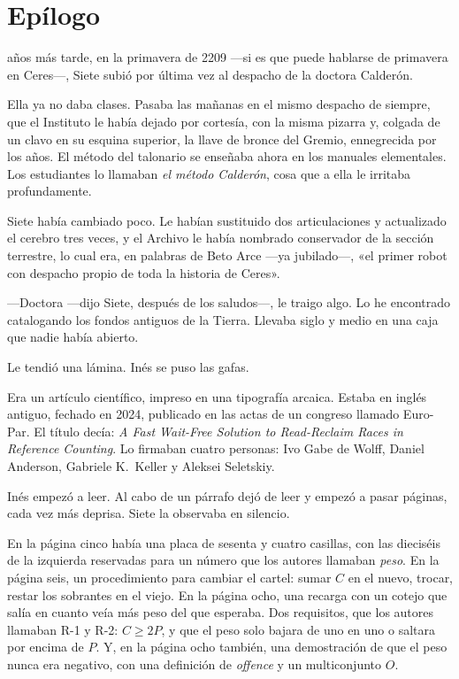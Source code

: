\chapter{Epílogo}

 años más tarde, en la primavera de 2209 ---si es que puede hablarse de primavera en Ceres---\nobreak, Siete subió por última vez al despacho de la doctora Calderón.

Ella ya no daba clases. Pasaba las mañanas en el mismo despacho de siempre, que el Instituto le había dejado por cortesía, con la misma pizarra y, colgada de un clavo en su esquina superior, la llave de bronce del Gremio, ennegrecida por los años. El método del talonario se enseñaba ahora en los manuales elementales. Los estudiantes lo llamaban \emph{el método Calderón}, cosa que a ella le irritaba profundamente.

Siete había cambiado poco. Le habían sustituido dos articulaciones y actualizado el cerebro tres veces, y el Archivo le había nombrado conservador de la sección terrestre, lo cual era, en palabras de Beto Arce ---ya jubilado---\nobreak, «el primer robot con despacho propio de toda la historia de Ceres».

---Doctora ---dijo Siete, después de los saludos---\nobreak, le traigo algo. Lo he encontrado catalogando los fondos antiguos de la Tierra. Llevaba siglo y medio en una caja que nadie había abierto.

Le tendió una lámina. Inés se puso las gafas.

Era un artículo científico, impreso en una tipografía arcaica. Estaba en inglés antiguo, fechado en 2024, publicado en las actas de un congreso llamado Euro-Par. El título decía: \emph{A Fast Wait-Free Solution to Read-Reclaim Races in Reference Counting}. Lo firmaban cuatro personas: Ivo Gabe de Wolff, Daniel Anderson, Gabriele K.\ Keller y Aleksei Seletskiy.

Inés empezó a leer. Al cabo de un párrafo dejó de leer y empezó a pasar páginas, cada vez más deprisa. Siete la observaba en silencio.

En la página cinco había una placa de sesenta y cuatro casillas, con las dieciséis de la izquierda reservadas para un número que los autores llamaban \emph{peso}. En la página seis, un procedimiento para cambiar el cartel: sumar $C$ en el nuevo, trocar, restar los sobrantes en el viejo. En la página ocho, una recarga con un cotejo que salía en cuanto veía más peso del que esperaba. Dos requisitos, que los autores llamaban R-1 y R-2: $C \geq 2P$, y que el peso solo bajara de uno en uno o saltara por encima de $P$. Y, en la página ocho también, una demostración de que el peso nunca era negativo, con una definición de \emph{offence} y un multiconjunto $O$.

